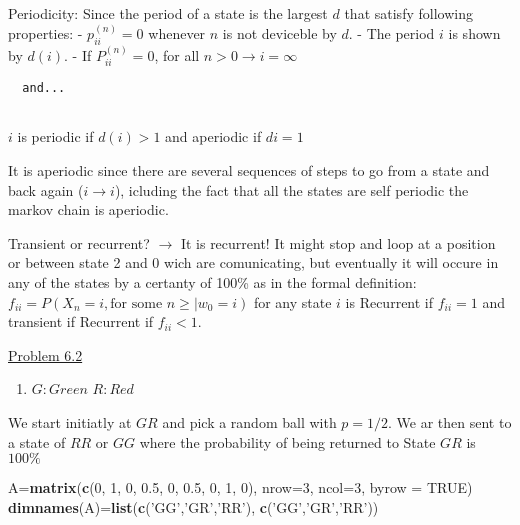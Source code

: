 \documentclass[]{article}
\newenvironment{Shaded}{\begin{snugshade}}{\end{snugshade}}
\newcommand{\DataTypeTok}[1]{\textcolor[rgb]{0.13,0.29,0.53}{#1}}
\newcommand{\DecValTok}[1]{\textcolor[rgb]{0.00,0.00,0.81}{#1}}
\newcommand{\FloatTok}[1]{\textcolor[rgb]{0.00,0.00,0.81}{#1}}
\newcommand{\KeywordTok}[1]{\textcolor[rgb]{0.13,0.29,0.53}{\textbf{#1}}}
\newcommand{\NormalTok}[1]{#1}
\newcommand{\OtherTok}[1]{\textcolor[rgb]{0.56,0.35,0.01}{#1}}
\newcommand{\StringTok}[1]{\textcolor[rgb]{0.31,0.60,0.02}{#1}}
\providecommand{\tightlist}{%
  \setlength{\itemsep}{0pt}\setlength{\parskip}{0pt}}
\begin{document}
Periodicity: Since the period of a state is the largest \(d\) that
satisfy following properties: - \(p_{ii}^{(n)} = 0\) whenever \(n\) is
not deviceble by \(d\). - The period \(i\) is shown by \(d(i)\). - If
\(P_{ii}^{(n)} = 0\), for all \(n>0\rightarrow{i}=\infty\)

\begin{verbatim}
  and...
  
\end{verbatim}

\(i\) is periodic if \(d(i)>1\) and aperiodic if \(di=1\)

It is aperiodic since there are several sequences of steps to go from a
state and back again (\(i\rightarrow i\)), icluding the fact that all
the states are self periodic the markov chain is aperiodic.

Transient or recurrent? \(\rightarrow\) It is recurrent! It might stop
and loop at a position or between state 2 and 0 wich are comunicating,
but eventually it will occure in any of the states by a certanty of
100\% as in the formal definition:
\(f_{ii}=P(X_{n} = i, \textrm{for some } n\geq|w_{0}=i)\) for any state
\(i\) is Recurrent if \(f_{ii}=1\) and transient if Recurrent if
\(f_{ii}<1\).

\underline{Problem 6.2}

\begin{enumerate}
\def\labelenumi{\alph{enumi})}
\tightlist
\item
  \(G: Green\) \(R: Red\)
\end{enumerate}

We start initiatly at \(GR\) and pick a random ball with \(p=1/2\). We
ar then sent to a state of \(RR\) or \(GG\) where the probability of
being returned to State \(GR\) is \(100\%\)

\begin{Shaded}
\begin{Highlighting}[]
\NormalTok{A=}\KeywordTok{matrix}\NormalTok{(}\KeywordTok{c}\NormalTok{(}\DecValTok{0}\NormalTok{, }\DecValTok{1}\NormalTok{, }\DecValTok{0}\NormalTok{, }\FloatTok{0.5}\NormalTok{, }\DecValTok{0}\NormalTok{, }\FloatTok{0.5}\NormalTok{, }\DecValTok{0}\NormalTok{, }\DecValTok{1}\NormalTok{, }\DecValTok{0}\NormalTok{), }\DataTypeTok{nrow=}\DecValTok{3}\NormalTok{, }\DataTypeTok{ncol=}\DecValTok{3}\NormalTok{, }\DataTypeTok{byrow =} \OtherTok{TRUE}\NormalTok{)}
\KeywordTok{dimnames}\NormalTok{(A)=}\KeywordTok{list}\NormalTok{(}\KeywordTok{c}\NormalTok{(}\StringTok{'GG'}\NormalTok{,}\StringTok{'GR'}\NormalTok{,}\StringTok{'RR'}\NormalTok{), }\KeywordTok{c}\NormalTok{(}\StringTok{'GG'}\NormalTok{,}\StringTok{'GR'}\NormalTok{,}\StringTok{'RR'}\NormalTok{))}
\end{Highlighting}
\end{Shaded}
\end{document}
